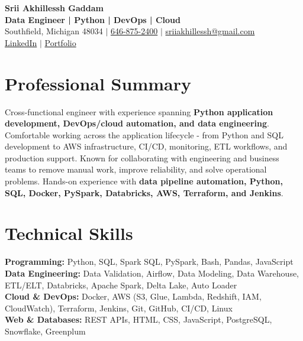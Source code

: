 \documentclass[letterpaper,10pt]{article}
\begin{document}
\fontsize{9.35pt}{10.45pt}\selectfont

\begin{center}
    {\LARGE \textbf{Srii Akhillessh Gaddam}} \\[-1pt]
    \textbf{Data Engineer | Python | DevOps | Cloud} \\[2pt]
    Southfield, Michigan 48034 $|$
    \href{tel:6468752400}{646-875-2400} $|$
    \href{mailto:sriiakhillessh@gmail.com}{sriiakhillessh@gmail.com} \\[1pt]
    \href{https://www.linkedin.com/in/srii-akhiilessh-gaddam-b48668191/}{LinkedIn} $|$
    \href{https://sriiakhillesshg.github.io/portfolio/}{Portfolio}
\end{center}
\vspace{-8pt}

\section{Professional Summary}
\small{Cross-functional engineer with experience spanning \textbf{Python application development, DevOps/cloud automation, and data engineering}. Comfortable working across the application lifecycle - from Python and SQL development to AWS infrastructure, CI/CD, monitoring, ETL workflows, and production support. Known for collaborating with engineering and business teams to remove manual work, improve reliability, and solve operational problems. Hands-on experience with \textbf{data pipeline automation, Python, SQL, Docker, PySpark, Databricks, AWS, Terraform, and Jenkins}.}

\section{Technical Skills}
\small{
\textbf{Programming:} Python, SQL, Spark SQL, PySpark, Bash, Pandas, JavaScript \\
\textbf{Data Engineering:} Data Validation, Airflow, Data Modeling, Data Warehouse, ETL/ELT, Databricks, Apache Spark, Delta Lake, Auto Loader \\
\textbf{Cloud \& DevOps:} Docker, AWS (S3, Glue, Lambda, Redshift, IAM, CloudWatch), Terraform, Jenkins, Git, GitHub, CI/CD, Linux \\
\textbf{Web \& Databases:} REST APIs, HTML, CSS, JavaScript, PostgreSQL, Snowflake, Greenplum
}
\end{document}
